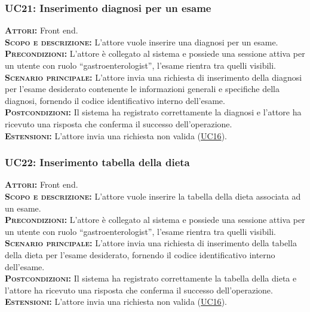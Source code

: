 \subsubsection{UC21: Inserimento diagnosi per un esame}
\label{sec:UC21}
\textsc{\textbf{Attori:}} Front end.\\
\textsc{\textbf{Scopo e descrizione:}} L'attore vuole inserire una diagnosi per un esame.\\
\textsc{\textsc{\textbf{Precondizioni:}}} L'attore è collegato al sistema e possiede una sessione attiva per un utente con ruolo ``gastroenterologist'', l'esame rientra tra quelli visibili.\\
\textsc{\textbf{Scenario principale:}}  L'attore invia una richiesta di inserimento della diagnosi per l'esame desiderato contenente le informazioni generali e specifiche della diagnosi, fornendo il codice identificativo interno dell'esame.\\
\textsc{\textbf{Postcondizioni:}} Il sistema ha registrato correttamente la diagnosi e l'attore ha ricevuto una risposta che conferma il successo dell'operazione.\\
\textsc{\textbf{Estensioni:}} L'attore invia una richiesta non valida (\hyperref[sec:UC16]{UC16}).

\subsubsection{UC22: Inserimento tabella della dieta}
\label{sec:UC22}
\textsc{\textbf{Attori:}} Front end.\\
\textsc{\textbf{Scopo e descrizione:}} L'attore vuole inserire la tabella della dieta associata ad un esame.\\
\textsc{\textsc{\textbf{Precondizioni:}}} L'attore è collegato al sistema e possiede una sessione attiva per un utente con ruolo ``gastroenterologist'', l'esame rientra tra quelli visibili.\\
\textsc{\textbf{Scenario principale:}}  L'attore invia una richiesta di inserimento della tabella della dieta per l'esame desiderato, fornendo il codice identificativo interno dell'esame.\\
\textsc{\textbf{Postcondizioni:}} Il sistema ha registrato correttamente la tabella della dieta e l'attore ha ricevuto una risposta che conferma il successo dell'operazione.\\
\textsc{\textbf{Estensioni:}} L'attore invia una richiesta non valida (\hyperref[sec:UC16]{UC16}).

